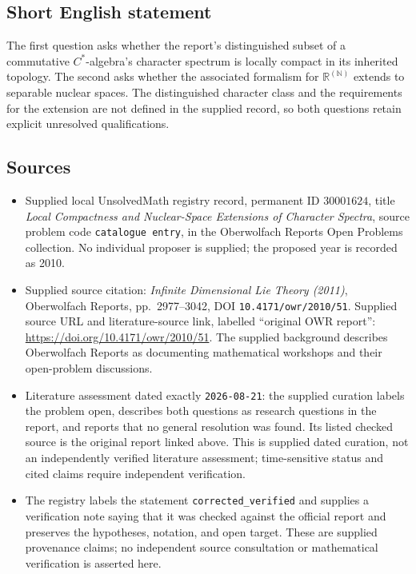 \documentclass[11pt]{article}
\newcommand{\N}{\mathbb{N}}
\newcommand{\R}{\mathbb{R}}
\begin{document}
\subsection{Short English statement}
The first question asks whether the report's distinguished subset of a commutative \(C^*\)-algebra's character spectrum is locally compact in its inherited topology. The second asks whether the associated formalism for \(\R^{(\N)}\) extends to separable nuclear spaces. The distinguished character class and the requirements for the extension are not defined in the supplied record, so both questions retain explicit unresolved qualifications.
\subsection{Sources}
\begin{itemize}
\item Supplied local UnsolvedMath registry record, permanent ID \(30001624\), title \emph{Local Compactness and Nuclear-Space Extensions of Character Spectra}, source problem code \texttt{catalogue entry}, in the Oberwolfach Reports Open Problems collection. No individual proposer is supplied; the proposed year is recorded as 2010.
\item Supplied source citation: \emph{Infinite Dimensional Lie Theory (2011)}, Oberwolfach Reports, pp.\ 2977--3042, DOI \texttt{10.4171/owr/2010/51}. Supplied source URL and literature-source link, labelled ``original OWR report'': \url{https://doi.org/10.4171/owr/2010/51}. The supplied background describes Oberwolfach Reports as documenting mathematical workshops and their open-problem discussions.
\item Literature assessment dated exactly \texttt{2026-08-21}: the supplied curation labels the problem open, describes both questions as research questions in the report, and reports that no general resolution was found. Its listed checked source is the original report linked above. This is supplied dated curation, not an independently verified literature assessment; time-sensitive status and cited claims require independent verification.
\item The registry labels the statement \texttt{corrected\_verified} and supplies a verification note saying that it was checked against the official report and preserves the hypotheses, notation, and open target. These are supplied provenance claims; no independent source consultation or mathematical verification is asserted here.
\end{itemize}
\end{document}
